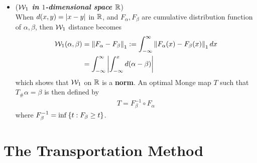 \documentclass[11pt]{article}
\begin{document}
\begin{itemize}
\item \begin{example} (\textbf{\emph{${\mathcal W}_1$ in $1$-dimensional space ${\mathbb R}$}}) \\
When $d(x, y) = \left\lvert x - y \right\rvert$ in ${\mathbb R}$, and $F_{\alpha}, F_{\beta}$ are cumulative distribution function  of $\alpha, \beta$,    then ${\mathcal W}_1$ distance becomes
\begin{align*}
{\mathcal W}_{1}(\alpha, \beta) &=  \left\|F_{\alpha} - F_{\beta}\right\|_{1} := \int_{-\infty}^{\infty}\left\|F_{\alpha}(x) - F_{\beta}(x)\right\|_{1} dx \\
&=  \int_{-\infty}^{\infty}\left\lvert \int_{-\infty}^{x}d(\alpha - \beta)  \right\rvert
\end{align*} which shows that ${\mathcal W}_1$ on ${\mathbb R}$ is a \textbf{norm}. An optimal Monge map $T$ such that $T_{\#}\alpha = \beta$ is then defined by
\begin{align*}
T = F_{\beta}^{-1} \circ  F_{\alpha}   
\end{align*} where $F_{\beta}^{-1} = \inf\left\{t: F_{\beta} \ge t\right\}$.
\end{example}
\end{itemize}

\section{The Transportation Method}
\end{document}
